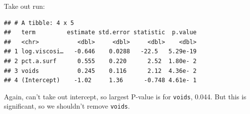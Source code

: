 \documentclass[ignorenonframetext,]{beamer}
\newenvironment{Shaded}{\begin{snugshade}}{\end{snugshade}}
\newcommand{\FloatTok}[1]{\textcolor[rgb]{0.00,0.00,0.81}{#1}}
\newcommand{\KeywordTok}[1]{\textcolor[rgb]{0.13,0.29,0.53}{\textbf{#1}}}
\newcommand{\NormalTok}[1]{#1}
\newcommand{\OperatorTok}[1]{\textcolor[rgb]{0.81,0.36,0.00}{\textbf{#1}}}
\newcommand{\StringTok}[1]{\textcolor[rgb]{0.31,0.60,0.02}{#1}}
\begin{document}
\begin{frame}[fragile]{Take out run:}
\protect\hypertarget{take-out-run}{}

\begin{Shaded}
\end{Shaded}

\begin{verbatim}
## # A tibble: 4 x 5
##   term         estimate std.error statistic  p.value
##   <chr>           <dbl>     <dbl>     <dbl>    <dbl>
## 1 log.viscosi…   -0.646    0.0288   -22.5   5.29e-19
## 2 pct.a.surf      0.555    0.220      2.52  1.80e- 2
## 3 voids           0.245    0.116      2.12  4.36e- 2
## 4 (Intercept)    -1.02     1.36      -0.748 4.61e- 1
\end{verbatim}

Again, can't take out intercept, so largest P-value is for
\texttt{voids}, 0.044. But this is significant, so we shouldn't remove
\texttt{voids}.

\end{frame}
\end{document}
